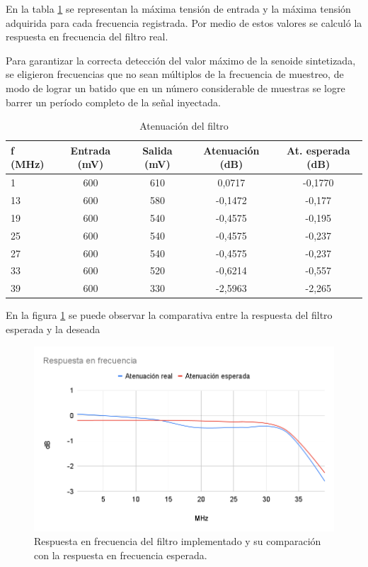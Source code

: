 \vspace{5mm}

En la tabla \ref{tab:tensiones} se representan la máxima tensión de entrada y la máxima tensión adquirida para cada frecuencia registrada. Por medio de estos valores se calculó la respuesta en frecuencia del filtro real.
 
Para garantizar la correcta detección del valor máximo de la senoide sintetizada, se eligieron frecuencias que no sean múltiplos de la frecuencia de muestreo, de modo de lograr un batido que en un número considerable de muestras se logre barrer un período completo de la señal inyectada.
 
\vspace{5mm}

\begin{table}[h]
\centering
\caption[Antenuación del filtro]{Atenuación del filtro}
\begin{tabular*}{\textwidth}{l c c c c}
\toprule
\textbf{f (MHz)} & \textbf{Entrada (mV)} & \textbf{Salida (mV)} & \textbf{Atenuación (dB)} & \textbf{At. esperada (dB)}\\
\midrule
1 & 600 & 610 & 0,0717 & -0,1770 \\
13 & 600 & 580 & -0,1472 & -0,177 \\
19 & 600 & 540 & -0,4575 & -0,195 \\
25 & 600 & 540 & -0,4575 & -0,237 \\
27 & 600 & 540 & -0,4575 & -0,237 \\
33 & 600 & 520 & -0,6214 & -0,557 \\
39 & 600 & 330 & -2,5963 & -2,265 \\
\bottomrule
\hline
\end{tabular*}
\label{tab:tensiones}
\end{table}

\vspace{5mm}

En la figura \ref{fig:respFrecReal} se puede observar la comparativa entre la respuesta del filtro esperada y la deseada

\vspace{5mm}

\begin{figure}[ht]
	\centering
	\includegraphics[width=140mm]{./Figures/respFrecReal.png}
	\caption{Respuesta en frecuencia del filtro implementado y su comparación con la respuesta en frecuencia esperada.}
	\label{fig:respFrecReal}
\end{figure}

